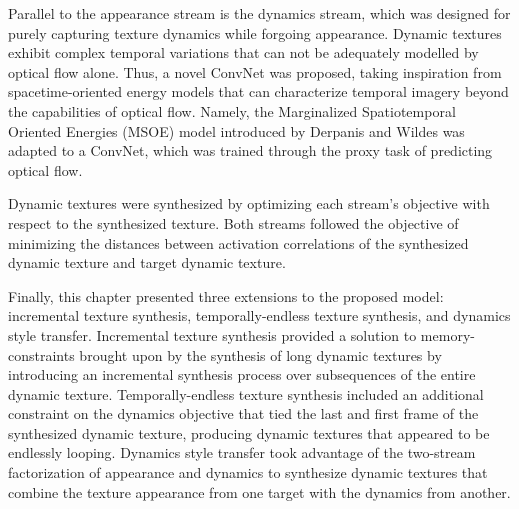 Parallel to the appearance stream is the dynamics stream, which was designed for purely capturing texture dynamics while forgoing appearance. Dynamic textures exhibit complex temporal variations that can not be adequately modelled by optical flow alone. Thus, a novel ConvNet was proposed, taking inspiration from spacetime-oriented energy models \cite{derpanis2012spacetime,simoncelli1998} that can characterize temporal imagery beyond the capabilities of optical flow. Namely, the Marginalized Spatiotemporal Oriented Energies (MSOE) model introduced by Derpanis and Wildes \cite{derpanis2012spacetime} was adapted to a ConvNet, which was trained through the proxy task of predicting optical flow.

Dynamic textures were synthesized by optimizing each stream's objective with respect to the synthesized texture. Both streams followed the objective of minimizing the distances between activation correlations of the synthesized dynamic texture and target dynamic texture.

Finally, this chapter presented three extensions to the proposed model: incremental texture synthesis, temporally-endless texture synthesis, and dynamics style transfer. Incremental texture synthesis provided a solution to memory-constraints brought upon by the synthesis of long dynamic textures by introducing an incremental synthesis process over subsequences of the entire dynamic texture. Temporally-endless texture synthesis included an additional constraint on the dynamics objective that tied the last and first frame of the synthesized dynamic texture, producing dynamic textures that appeared to be endlessly looping. Dynamics style transfer took advantage of the two-stream factorization of appearance and dynamics to synthesize dynamic textures that combine the texture appearance from one target with the dynamics from another.